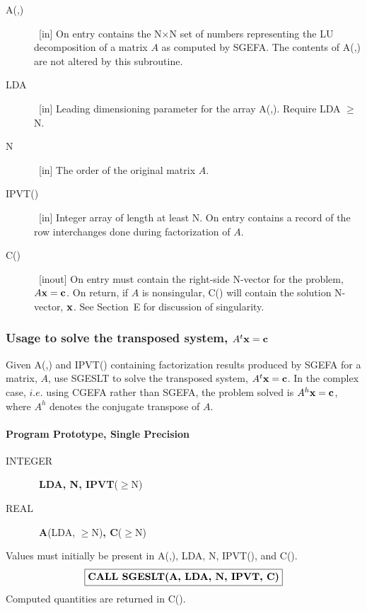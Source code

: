 \documentclass[twoside]{MATH77}
\begin{document}
\begin{description}
\item[A(,)] \ [in] On entry contains the N$\times $N set of numbers representing the
LU decomposition of a matrix $A$ as computed by SGEFA. The contents of A(,) are
not altered by this subroutine.

\item[LDA] \ [in] Leading dimensioning parameter for the array A(,). Require LDA $
\geq\ $N.

\item[N] \ [in] The order of the original matrix $A$.

\item[IPVT()] \ [in] Integer array of length at least N. On entry contains a record
of the row interchanges done during factorization of $A$.

\item[C()] \ [inout] On entry must contain the right-side N-vector for the
problem, $A{\bf x} = {\bf c}$. On return, if $A$ is nonsingular, C() will contain the
solution N-vector, ${\bf x}$. See Section~E for discussion of singularity.
\end{description}

\subsubsection{Usage to solve the transposed system, $A^t{\bf x} = {\bf c}$}

Given A(,) and IPVT() containing factorization results produced by SGEFA for
a matrix, $A$, use SGESLT to solve the transposed system, $A^t{\bf x} = {\bf c}$. In the
complex case, $i.e$. using CGEFA rather than SGEFA, the problem solved is $%
A^h{\bf x} = {\bf c}$, where $A^h$ denotes the conjugate transpose of $A$.

\paragraph{Program Prototype, Single Precision}

\begin{description}

\item[INTEGER] \ {\bf LDA, N, IPVT}($\geq $N)

\item[REAL] \ {\bf A}(LDA, $\geq $N){\bf , C}($\geq $N)

\end{description}

Values must initially be present in A(,), LDA, N, IPVT(), and C().
$$
\fbox{\bf CALL SGESLT(A, LDA, N, IPVT, C)}
$$
Computed quantities are returned in C().
\end{document}

